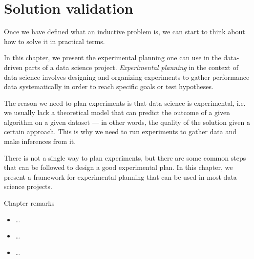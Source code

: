 \chapter{Solution validation}
\label{chap:planning}
\glsresetall


Once we have defined what an inductive problem is, we can start to think about how to
solve it in practical terms.

In this chapter, we present the experimental planning one can use in the data-driven
parts of a data science project.  \emph{Experimental planning}  in the context of data
science involves designing and organizing experiments to gather performance data
systematically in order to reach specific goals or test hypotheses.

The reason we need to plan experiments is that data science is experimental, i.e. we
usually lack a theoretical model that can predict the outcome of a given algorithm on a
given dataset  --- in other words, the quality of the solution given a certain approach.
This is why we need to run experiments to gather data and make
inferences from it.

There is not a single way to plan experiments, but there are some common steps that can
be followed to design a good experimental plan.  In this chapter, we present a
framework for experimental planning that can be used in most data science projects.

\begin{mainbox}{Chapter remarks}


  \startcontents[chapters]
  \vspace{1em}


  \begin{itemize}
    \item \dots
  \end{itemize}


  \begin{itemize}
    \item \dots
  \end{itemize}


  \begin{itemize}
    \item \dots
  \end{itemize}
\end{mainbox}

